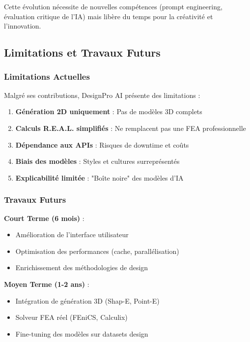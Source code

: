 Cette évolution nécessite de nouvelles compétences (prompt engineering, évaluation critique de l'IA) mais libère du temps pour la créativité et l'innovation.

\subsection{Limitations et Travaux Futurs}

\subsubsection{Limitations Actuelles}

Malgré ses contributions, DesignPro AI présente des limitations :

\begin{enumerate}[leftmargin=*]
    \item \textbf{Génération 2D uniquement} : Pas de modèles 3D complets
    \item \textbf{Calculs R.E.A.L. simplifiés} : Ne remplacent pas une FEA professionnelle
    \item \textbf{Dépendance aux APIs} : Risques de downtime et coûts
    \item \textbf{Biais des modèles} : Styles et cultures surreprésentés
    \item \textbf{Explicabilité limitée} : "Boîte noire" des modèles d'IA
\end{enumerate}

\subsubsection{Travaux Futurs}

\textbf{Court Terme (6 mois)} :
\begin{itemize}[leftmargin=*]
    \item Amélioration de l'interface utilisateur
    \item Optimisation des performances (cache, parallélisation)
    \item Enrichissement des méthodologies de design
\end{itemize}

\textbf{Moyen Terme (1-2 ans)} :
\begin{itemize}[leftmargin=*]
    \item Intégration de génération 3D (Shap-E, Point-E)
    \item Solveur FEA réel (FEniCS, Calculix)
    \item Fine-tuning des modèles sur datasets design
\end{itemize}

